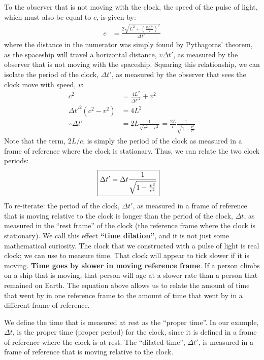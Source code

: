 To the observer that is not moving with the clock, the speed of the pulse of light, which must also be equal to $c$, is given by:
\begin{align*}
c&=\frac{2\sqrt{L^2+\left(\frac{v\Delta t'}{2}\right)^2}}{\Delta t'}
\end{align*}
where the distance in the numerator was simply found by Pythagoras' theorem, as the spaceship will travel a horizontal distance, $v\Delta t'$, as measured by the observer that is not moving with the spaceship. Squaring this relationship, we can isolate the period of the clock, $\Delta t'$, as measured by the observer that sees the clock move with speed, $v$:
\begin{align*}
c^2&=\frac{4L^2}{\Delta t'^2}+v^2\\
\Delta t'^2 (c^2-v^2)&=4L^2\\
\therefore \Delta t' &= 2L\frac{1}{\sqrt{c^2-v^2}}=\frac{2L}{c}\frac{1}{\sqrt{1-\frac{v^2}{c^2}}}
\end{align*}
Note that the term, $2L/c$, is simply the period of the clock as measured in a frame of reference where the clock is stationary. Thus, we can relate the two clock periods:
\begin{align*}
\Aboxed{\Delta t' &= \Delta t \frac{1}{\sqrt{1-\frac{v^2}{c^2}}}}
\end{align*}
To re-iterate: the period of the clock, $\Delta t'$, as measured in a frame of reference that is moving relative to the clock is longer than the period of the clock, $\Delta t$, as measured in the ``rest frame'' of the clock (the reference frame where the clock is stationary). We call this effect \textbf{``time dilation''}, and it is not just some mathematical curiosity. The clock that we constructed with a pulse of light is real clock; we can use to measure time. That clock will appear to tick slower if it is moving. \textbf{Time goes by slower in moving reference frame}. If a person climbs on a ship that is moving, that person will age at a slower rate than a person that remained on Earth. The equation above allows us to relate the amount of time that went by in one reference frame to the amount of time that went by in a different frame of reference.

We define the time that is measured at rest as the ``proper time''. In our example, $\Delta t$, is the proper time (proper period) for the clock, since it is defined in a frame of reference where the clock is at rest. The ``dilated time'', $\Delta t'$, is measured in a frame of reference that is moving relative to the clock.

